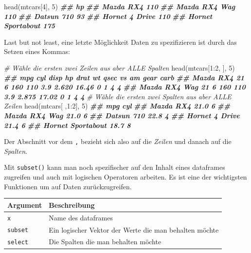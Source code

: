 \documentclass[
]{article}
\newenvironment{Shaded}{\begin{snugshade}}{\end{snugshade}}
\newcommand{\CommentTok}[1]{\textcolor[rgb]{0.56,0.35,0.01}{\textit{#1}}}
\newcommand{\DecValTok}[1]{\textcolor[rgb]{0.00,0.00,0.81}{#1}}
\newcommand{\DocumentationTok}[1]{\textcolor[rgb]{0.56,0.35,0.01}{\textbf{\textit{#1}}}}
\newcommand{\FunctionTok}[1]{\textcolor[rgb]{0.00,0.00,0.00}{#1}}
\newcommand{\NormalTok}[1]{#1}
\newcommand{\SpecialCharTok}[1]{\textcolor[rgb]{0.00,0.00,0.00}{#1}}
\begin{document}
\begin{Shaded}
\begin{Highlighting}[]
\FunctionTok{head}\NormalTok{(mtcars[}\DecValTok{4}\NormalTok{], }\DecValTok{5}\NormalTok{)}
\DocumentationTok{\#\#                    hp}
\DocumentationTok{\#\# Mazda RX4         110}
\DocumentationTok{\#\# Mazda RX4 Wag     110}
\DocumentationTok{\#\# Datsun 710         93}
\DocumentationTok{\#\# Hornet 4 Drive    110}
\DocumentationTok{\#\# Hornet Sportabout 175}
\end{Highlighting}
\end{Shaded}

Last but not least, eine letzte Möglichkeit Daten zu spezifizieren ist durch das Setzen eines Kommas:

\begin{Shaded}
\begin{Highlighting}[]
\CommentTok{\# Wähle die ersten zwei Zeilen aus aber ALLE Spalten}
\FunctionTok{head}\NormalTok{(mtcars[}\DecValTok{1}\SpecialCharTok{:}\DecValTok{2}\NormalTok{, ], }\DecValTok{5}\NormalTok{)}
\DocumentationTok{\#\#               mpg cyl disp  hp drat    wt  qsec vs am gear carb}
\DocumentationTok{\#\# Mazda RX4      21   6  160 110  3.9 2.620 16.46  0  1    4    4}
\DocumentationTok{\#\# Mazda RX4 Wag  21   6  160 110  3.9 2.875 17.02  0  1    4    4}
\CommentTok{\# Wähle die ersten zwei Spalten aus aber ALLE Zeilen}
\FunctionTok{head}\NormalTok{(mtcars[ ,}\DecValTok{1}\SpecialCharTok{:}\DecValTok{2}\NormalTok{], }\DecValTok{5}\NormalTok{)}
\DocumentationTok{\#\#                    mpg cyl}
\DocumentationTok{\#\# Mazda RX4         21.0   6}
\DocumentationTok{\#\# Mazda RX4 Wag     21.0   6}
\DocumentationTok{\#\# Datsun 710        22.8   4}
\DocumentationTok{\#\# Hornet 4 Drive    21.4   6}
\DocumentationTok{\#\# Hornet Sportabout 18.7   8}
\end{Highlighting}
\end{Shaded}

Der Abschnitt vor dem \texttt{,} bezieht sich also auf die \emph{Zeilen} und danach auf die \emph{Spalten}.

Mit \texttt{subset()} kann man noch spezifischer auf den Inhalt eines dataframes zugreifen und auch mit logischen Operatoren arbeiten. Es ist eine der wichtigsten Funktionen um auf Daten zurückzugreifen.

\begin{longtable}[]{@{}ll@{}}
\toprule
Argument & Beschreibung \\
\midrule
\endhead
\texttt{x} & Name des dataframes \\
\texttt{subset} & Ein logischer Vektor der Werte die man behalten möchte \\
\texttt{select} & Die Spalten die man behalten möchte \\
\bottomrule
\end{longtable}
\end{document}
